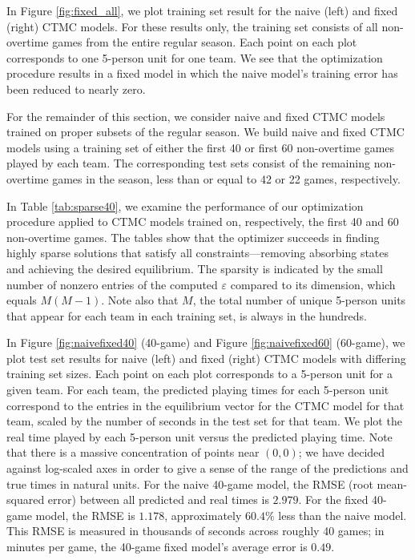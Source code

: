 \documentclass[review,letterpaper,11pt]{elsarticle}
\begin{document}
In Figure \ref{fig:fixed_all}, we plot training set result for the naive (left) and fixed (right) CTMC models.  For these results only, the training set consists of all non-overtime games from the entire regular season.  Each point on each plot corresponds to one 5-person unit for one team.  We see that the optimization procedure results in a fixed model in which the naive model's training error has been reduced to nearly zero.

For the remainder of this section, we consider naive and fixed CTMC models trained on proper subsets of the regular season.  We build naive and fixed CTMC models using a training set of either the first 40 or first 60 non-overtime games played by each team.  The corresponding test sets consist of the remaining non-overtime games in the season, less than or equal to 42 or 22 games, respectively.

In Table \ref{tab:sparse40}, we examine the performance of our optimization procedure applied to CTMC models trained on, respectively, the first 40 and 60 non-overtime games.  The tables show that the optimizer succeeds in finding highly sparse solutions that satisfy all constraints---removing absorbing states and achieving the desired equilibrium.  The sparsity is indicated by the small number of nonzero entries of the computed $\varepsilon$ compared to its dimension, which equals $M(M-1)$.  Note also that $M$, the total number of unique 5-person units that appear for each team in each training set, is always in the hundreds.

In Figure \ref{fig:naivefixed40} (40-game) and Figure \ref{fig:naivefixed60} (60-game), we plot test set results for naive (left) and fixed (right) CTMC models with differing training set sizes.
Each point on each plot corresponds to a 5-person unit for a given team.  For each team, the predicted playing times for each 5-person unit correspond to the entries in the equilibrium vector for the CTMC model for that team, scaled by the number of seconds in the test set for that team.  We plot the real time played by each 5-person unit versus the predicted playing time.  Note that there is a massive concentration of points near $(0,0)$; we have decided against log-scaled axes in order to give a sense of the range of the predictions and true times in natural units.  For the naive 40-game model, the RMSE (root mean-squared error) between all predicted and real times is $2.979$.  For the fixed 40-game model, the RMSE is $1.178$, approximately $60.4\%$ less than the naive model.  This RMSE is measured in thousands of seconds across roughly 40 games; in minutes per game, the 40-game fixed model's average error is $0.49$.  
\end{document}
